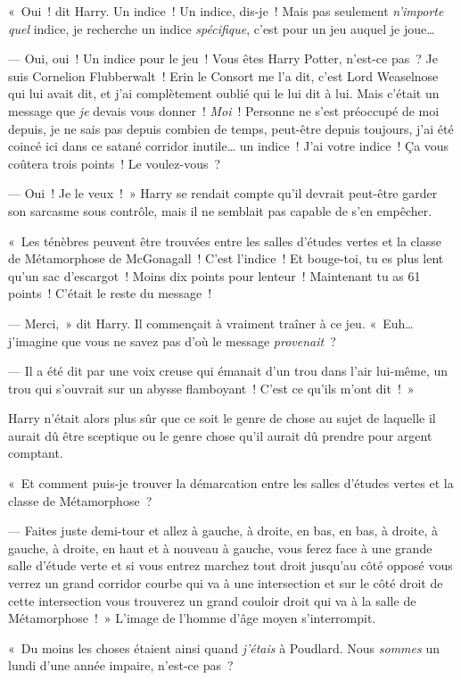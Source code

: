 «~Oui~! dit Harry. Un indice~! Un indice, dis-je~! Mais pas seulement \emph{n'importe quel} indice, je recherche un indice \emph{spécifique}, c'est pour un jeu auquel je joue…

--- Oui, oui~! Un indice pour le jeu~! Vous êtes Harry Potter, n'est-ce pas~? Je suis Cornelion Flubberwalt~! Erin le Consort me l'a dit, c’est Lord Weaselnose qui lui avait dit, et j’ai complètement oublié qui le lui dit à lui. Mais c'était un message que \emph{je} devais vous donner~! \emph{Moi}~! Personne ne s'est préoccupé de moi depuis, je ne sais pas depuis combien de temps, peut-être depuis toujours, j'ai été coincé ici dans ce satané corridor inutile… un indice~! J'ai votre indice~! Ça vous coûtera trois points~! Le voulez-vous~?

--- Oui~! Je le veux~!~» Harry se rendait compte qu'il devrait peut-être garder son sarcasme sous contrôle, mais il ne semblait pas capable de s'en empêcher.

«~Les ténèbres peuvent être trouvées entre les salles d'études vertes et la classe de Métamorphose de McGonagall~! C'est l'indice~! Et bouge-toi, tu es plus lent qu'un sac d'escargot~! Moins dix points pour lenteur~! Maintenant tu as 61 points~! C'était le reste du message~!

--- Merci,~» dit Harry. Il commençait à vraiment traîner à ce jeu. «~Euh… j'imagine que vous ne savez pas d'où le message \emph{provenait}~?

--- Il a été dit par une voix creuse qui émanait d'un trou dans l'air lui-même, un trou qui s'ouvrait sur un abysse flamboyant~! C'est ce qu'ils m'ont dit~!~»

Harry n'était alors plus sûr que ce soit le genre de chose au sujet de laquelle il aurait dû être sceptique ou le genre chose qu'il aurait dû prendre pour argent comptant.

«~Et comment puis-je trouver la démarcation entre les salles d'études vertes et la classe de Métamorphose~?

--- Faites juste demi-tour et allez à gauche, à droite, en bas, en bas, à droite, à gauche, à droite, en haut et à nouveau à gauche, vous ferez face à une grande salle d'étude verte et si vous entrez marchez tout droit jusqu'au côté opposé vous verrez un grand corridor courbe qui va à une intersection et sur le côté droit de cette intersection vous trouverez un grand couloir droit qui va à la salle de Métamorphose~!~» L'image de l'homme d'âge moyen s'interrompit.

«~Du moins les choses étaient ainsi quand \emph{j'étais} à Poudlard. Nous \emph{sommes} un lundi d'une année impaire, n'est-ce pas~?

